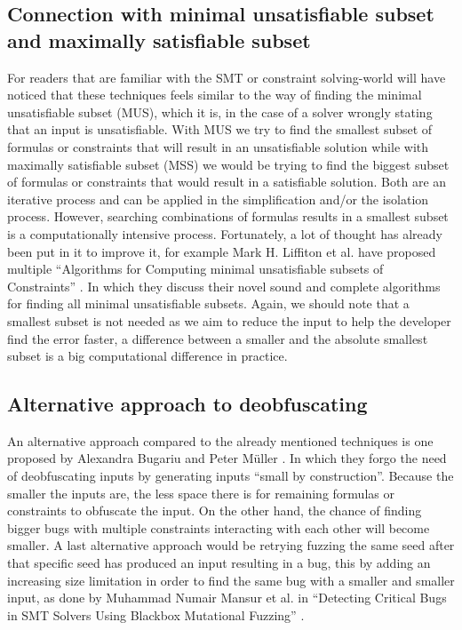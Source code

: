 \subsection{Connection with minimal unsatisfiable subset and maximally satisfiable subset}
\label{inputReduction:MUS/MSS}
For readers that are familiar with the SMT or constraint solving-world will have noticed that these techniques feels similar to the way of finding the minimal unsatisfiable subset (MUS), which it is, in the case of a solver wrongly stating that an input is unsatisfiable. 
With MUS we try to find the smallest subset of formulas or constraints that will result in an unsatisfiable solution while with maximally satisfiable subset (MSS) we would be trying to find the biggest subset of formulas or constraints that would result in a satisfiable solution. Both are an iterative process and can be applied in the simplification and/or the isolation process. However, searching combinations of formulas results in a smallest subset is a computationally intensive process. Fortunately, a lot of thought has already been put in it to improve it, for example Mark H. Liffiton et al. have proposed multiple “Algorithms for Computing minimal unsatisfiable subsets of Constraints” \cite{51liffiton2008algorithms}. In which they discuss their novel sound and complete algorithms for finding all minimal unsatisfiable subsets. Again, we should note that a smallest subset is not needed as we aim to reduce the input to help the developer find the error faster, a difference between a smaller and the absolute smallest subset is a big computational difference in practice.

\subsection{Alternative approach to deobfuscating}
\label{inputReduction:alt2deobfuscating}
An alternative approach compared to the already mentioned techniques is one proposed by Alexandra Bugariu and Peter M\"uller \cite{9bugariu2020automaticallyTestingStringSolvers}. In which they forgo the need of deobfuscating inputs by generating inputs “small by construction”. 
Because the smaller the inputs are, the less space there is for remaining formulas or constraints to obfuscate the input. On the other hand, the chance of finding bigger bugs with multiple constraints interacting with each other will become smaller.
A last alternative approach would be retrying fuzzing the same seed after that specific seed has produced an input resulting in a bug, this by adding an increasing size limitation in order to find the same bug with a smaller and smaller input, as done by Muhammad Numair Mansur et al. in “Detecting Critical Bugs in SMT Solvers Using Blackbox Mutational Fuzzing” \cite{1mansur2020detecting}.

